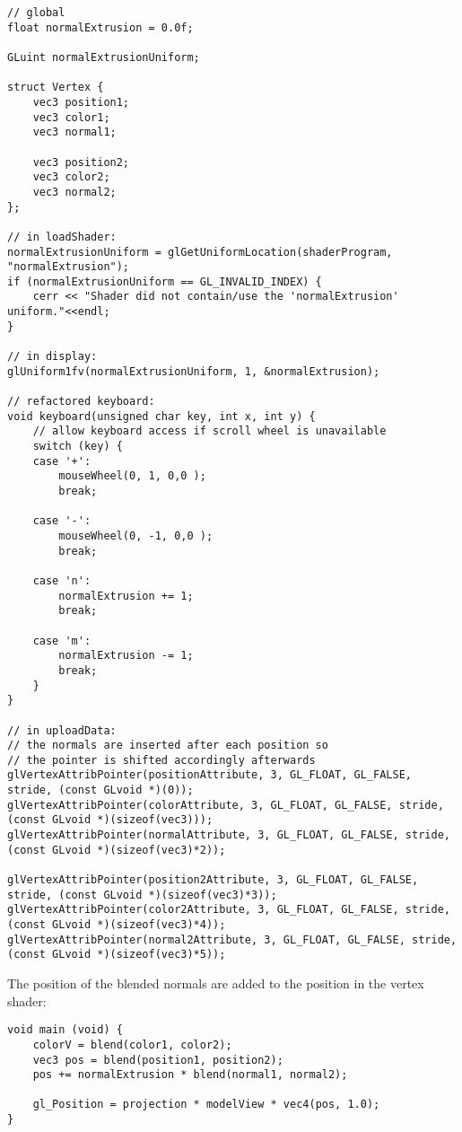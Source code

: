 \begin{lstlisting}
// global
float normalExtrusion = 0.0f;

GLuint normalExtrusionUniform;

struct Vertex {
    vec3 position1;
	vec3 color1;
	vec3 normal1;

	vec3 position2;
	vec3 color2;
	vec3 normal2;
};

// in loadShader:
normalExtrusionUniform = glGetUniformLocation(shaderProgram, "normalExtrusion");
if (normalExtrusionUniform == GL_INVALID_INDEX) {
	cerr << "Shader did not contain/use the 'normalExtrusion' uniform."<<endl;
}

// in display:
glUniform1fv(normalExtrusionUniform, 1, &normalExtrusion);

// refactored keyboard:
void keyboard(unsigned char key, int x, int y) {
	// allow keyboard access if scroll wheel is unavailable
	switch (key) {
	case '+':
		mouseWheel(0, 1, 0,0 );
		break;

	case '-':
		mouseWheel(0, -1, 0,0 );
		break;

	case 'n':
		normalExtrusion += 1;
		break;

	case 'm':
		normalExtrusion -= 1;
		break;
	}
}

// in uploadData:
// the normals are inserted after each position so
// the pointer is shifted accordingly afterwards
glVertexAttribPointer(positionAttribute, 3, GL_FLOAT, GL_FALSE, stride, (const GLvoid *)(0));
glVertexAttribPointer(colorAttribute, 3, GL_FLOAT, GL_FALSE, stride, (const GLvoid *)(sizeof(vec3)));
glVertexAttribPointer(normalAttribute, 3, GL_FLOAT, GL_FALSE, stride, (const GLvoid *)(sizeof(vec3)*2));

glVertexAttribPointer(position2Attribute, 3, GL_FLOAT, GL_FALSE, stride, (const GLvoid *)(sizeof(vec3)*3));
glVertexAttribPointer(color2Attribute, 3, GL_FLOAT, GL_FALSE, stride, (const GLvoid *)(sizeof(vec3)*4));
glVertexAttribPointer(normal2Attribute, 3, GL_FLOAT, GL_FALSE, stride, (const GLvoid *)(sizeof(vec3)*5));
\end{lstlisting}

The position of the blended normals are added to the position in the vertex shader:

\begin{lstlisting}
void main (void) {
    colorV = blend(color1, color2);
    vec3 pos = blend(position1, position2);
	pos += normalExtrusion * blend(normal1, normal2);

    gl_Position = projection * modelView * vec4(pos, 1.0);
}
\end{lstlisting}


